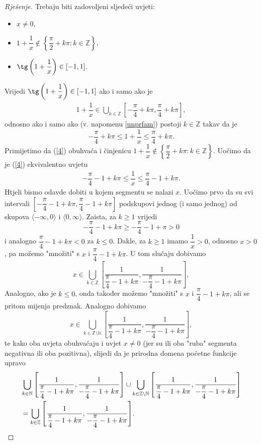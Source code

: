 \begin{proof}[Rješenje]
Trebaju biti zadovoljeni sljedeći uvjeti:
\begin{itemize}
\item \(x\neq 0\),
\item \(1+\dfrac{1}{x}\notin \left\{\dfrac{\pi}{2}+k\pi : k\in \mathbb{Z}\right\}\),
\item \(\tg\left(1+\dfrac{1}{x}\right)\in [-1, 1]\).
\end{itemize}
Vrijedi \(\tg\left(1+\dfrac{1}{x}\right)\in [-1, 1]\) ako i samo ako je
\begin{gather}
\label{4}
1+\dfrac{1}{x}\in \bigcup_{k\in \mathbb{Z}}{\left[-\dfrac{\pi}{4}+k\pi, \dfrac{\pi}{4}+k\pi\right]},
\end{gather}
odnosno ako i samo ako (v. napomenu \ref{unprfam}) postoji \(k\in \mathbb{Z}\) takav da je
\[-\dfrac{\pi}{4}+k\pi\leq 1+\dfrac{1}{x} \leq \dfrac{\pi}{4}+k\pi.\]
Primijetimo da (\ref{4}) obuhvaća i činjenicu \(1+\dfrac{1}{x}\notin \left\{\dfrac{\pi}{2}+k\pi : k\in \mathbb{Z}\right\}\). Uočimo da je (\ref{4}) ekvivalentno uvjetu
\begin{gather}
\label{5}
-\dfrac{\pi}{4}-1+k\pi\leq \dfrac{1}{x} \leq \dfrac{\pi}{4}-1+k\pi.
\end{gather}
Htjeli bismo odavde dobiti u kojem segmentu se nalazi \(x\). Uočimo prvo da su svi intervali \(\left[-\dfrac{\pi}{4}-1+k\pi, \dfrac{\pi}{4}-1+k\pi\right]\) podskupovi jednog (i samo jednog) od skupova \(\langle -\infty, 0\rangle\) i \(\langle 0, \infty\rangle\). Zaista, za \(k\geq 1\) vrijedi
\[-\dfrac{\pi}{4}-1+k\pi\geq -\dfrac{\pi}{4}-1+\pi>0\]
i analogno \(\dfrac{\pi}{4}-1+k\pi<0\) za \(k\leq 0\). Dakle, za \(k\geq 1\) imamo \(\dfrac{1}{x}>0\), odnosno \(x>0\), pa možemo "množiti" s \(x\) i \(\dfrac{\pi}{4}-1+k\pi\). U tom slučaju dobivamo
\[x\in \bigcup_{k\in \mathbb{Z}}{\left[\dfrac{1}{\dfrac{\pi}{4}-1+k\pi}, \dfrac{1}{-\dfrac{\pi}{4}-1+k\pi}\right]},\]
Analogno, ako je \(k\leq 0\), onda također možemo "množiti" s  \(x\) i \(\dfrac{\pi}{4}-1+k\pi\), ali se pritom mijenja predznak. Analogno dobivamo
\[x\in \bigcup_{k\in \mathbb{Z}\setminus{\mathbb{N}}}{\left[\dfrac{1}{\dfrac{\pi}{4}-1+k\pi}, \dfrac{1}{-\dfrac{\pi}{4}-1+k\pi}\right]},\]
te kako oba uvjeta obuhvaćaju i uvjet \(x\neq 0\) (jer su ili oba "ruba" segmenta negativna ili oba pozitivna), slijedi da je prirodna domena početne funkcije upravo 
\begin{align*}
&\bigcup_{k\in \mathbb{N}}{\left[\dfrac{1}{\dfrac{\pi}{4}-1+k\pi}, \dfrac{1}{-\dfrac{\pi}{4}-1+k\pi}\right]}\cup \bigcup_{k\in \mathbb{Z}\setminus{\mathbb{N}}}{\left[\dfrac{1}{\dfrac{\pi}{4}-1+k\pi}, \dfrac{1}{-\dfrac{\pi}{4}-1+k\pi}\right]}\\
&=\bigcup_{k\in \mathbb{Z}}{\left[\dfrac{1}{\dfrac{\pi}{4}-1+k\pi}, \dfrac{1}{-\dfrac{\pi}{4}-1+k\pi}\right]}.\qedhere
\end{align*}
\end{proof}
